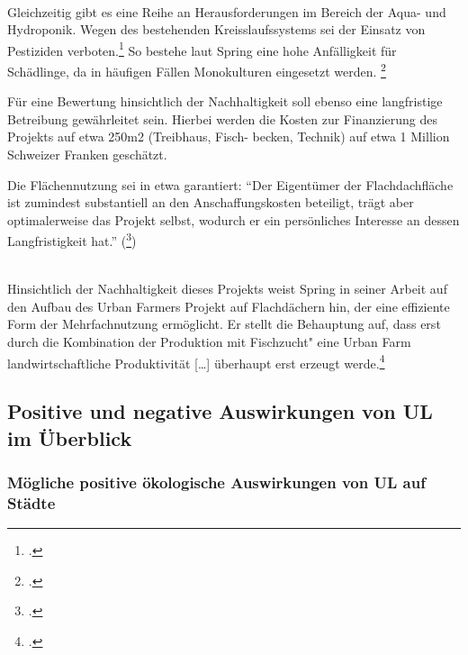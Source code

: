 \documentclass{scrartcl}
\begin{document}
\\
Gleichzeitig gibt es eine Reihe an Herausforderungen im Bereich der Aqua- und Hydroponik.
Wegen des bestehenden Kreisslaufssystems sei der Einsatz von Pestiziden verboten.\footcite[]{FreiMatthiasHartmann2007AquaponikGemuse.}  So bestehe laut Spring eine hohe Anfälligkeit für Schädlinge, da in häufigen Fällen Monokulturen eingesetzt werden. \footcite[S.27]{TobiasSpringDerBasel-Stadt}

Für eine Bewertung hinsichtlich der Nachhaltigkeit soll ebenso eine langfristige Betreibung gewährleitet sein. Hierbei werden die Kosten zur Finanzierung des Projekts auf etwa 250m2 (Treibhaus, Fisch- becken, Technik) auf etwa 1 Million Schweizer Franken geschätzt.

Die Flächennutzung sei in etwa garantiert: “Der Eigentümer der Flachdachfläche ist zumindest substantiell an den Anschaffungskosten beteiligt, trägt aber optimalerweise das Projekt selbst, wodurch er ein persönliches Interesse an dessen Langfristigkeit hat.” (\footcite[Vgl.][S.37]{TobiasSpringDerBasel-Stadt})

\\
Hinsichtlich der Nachhaltigkeit dieses Projekts weist Spring in seiner Arbeit auf den Aufbau des Urban Farmers Projekt auf Flachdächern hin, der eine effiziente Form der Mehrfachnutzung ermöglicht. Er stellt die Behauptung auf, dass erst durch die Kombination der Produktion mit Fischzucht" eine Urban Farm landwirtschaftliche Produktivität […] überhaupt erst erzeugt werde.\footcite[S.47]{TobiasSpringDerBasel-Stadt} 



\subsection{Positive und negative Auswirkungen von UL im Überblick}
     \subsubsection{Mögliche positive ökologische Auswirkungen von UL auf Städte}  
     
\end{document}
